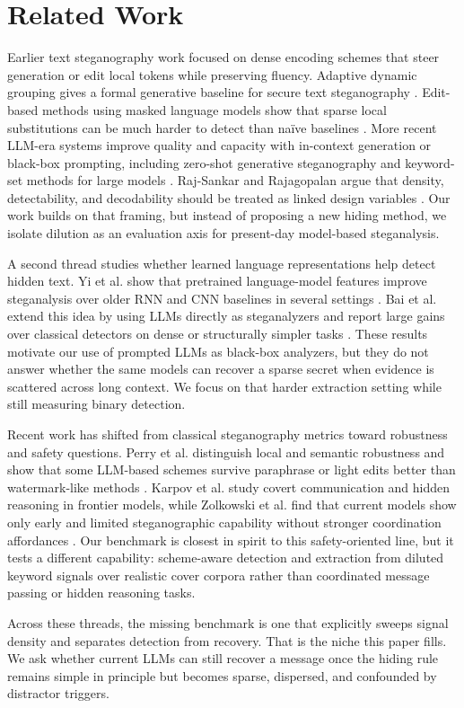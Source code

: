 \section{Related Work}
\label{sec:related_work}

 Earlier text steganography work focused on dense encoding schemes that steer generation or edit local tokens while preserving fluency. Adaptive dynamic grouping gives a formal generative baseline for secure text steganography \cite{zhang2021provably}. Edit-based methods using masked language models show that sparse local substitutions can be much harder to detect than naïve baselines \cite{ueoka2021masked}. More recent LLM-era systems improve quality and capacity with in-context generation or black-box prompting, including zero-shot generative steganography and keyword-set methods for large models \cite{lin2024zeroshot,wu2024generative}. Raj-Sankar and Rajagopalan argue that density, detectability, and decodability should be treated as linked design variables \cite{rajsankar2023science}. Our work builds on that framing, but instead of proposing a new hiding method, we isolate dilution as an evaluation axis for present-day model-based steganalysis.

 A second thread studies whether learned language representations help detect hidden text. Yi et al. show that pretrained language-model features improve steganalysis over older RNN and CNN baselines in several settings \cite{yi2021efficient}. Bai et al. extend this idea by using LLMs directly as steganalyzers and report large gains over classical detectors on dense or structurally simpler tasks \cite{bai2024nextgen}. These results motivate our use of prompted LLMs as black-box analyzers, but they do not answer whether the same models can recover a sparse secret when evidence is scattered across long context. We focus on that harder extraction setting while still measuring binary detection.

 Recent work has shifted from classical steganography metrics toward robustness and safety questions. Perry et al. distinguish local and semantic robustness and show that some LLM-based schemes survive paraphrase or light edits better than watermark-like methods \cite{perry2025robust}. Karpov et al. study covert communication and hidden reasoning in frontier models, while Zolkowski et al. find that current models show only early and limited steganographic capability without stronger coordination affordances \cite{karpov2025potentials,zolkowski2025early}. Our benchmark is closest in spirit to this safety-oriented line, but it tests a different capability: scheme-aware detection and extraction from diluted keyword signals over realistic cover corpora rather than coordinated message passing or hidden reasoning tasks.

 Across these threads, the missing benchmark is one that explicitly sweeps signal density and separates detection from recovery. That is the niche this paper fills. We ask whether current LLMs can still recover a message once the hiding rule remains simple in principle but becomes sparse, dispersed, and confounded by distractor triggers.
